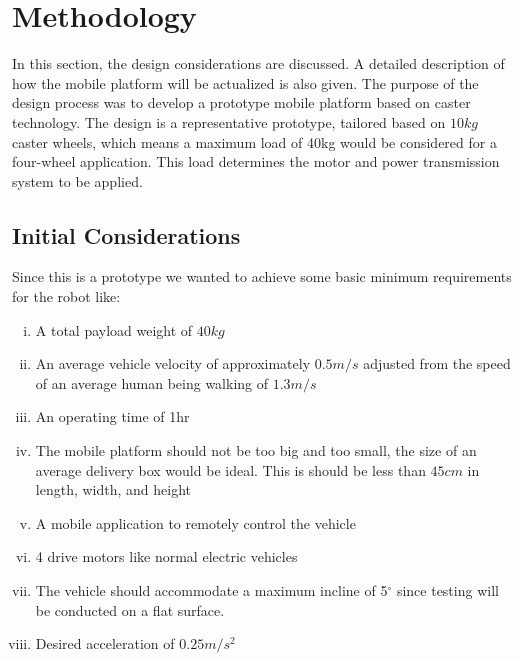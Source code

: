 \chapter{Methodology}
In this section, the design considerations are discussed. A detailed description of how the mobile platform will be actualized is also given. The purpose of the design process was to develop a prototype mobile platform based on caster technology. The design is a representative prototype, tailored based on $10kg$ caster wheels, which means a maximum load of 40kg would be considered for a four-wheel application. This load determines the motor and power transmission system to be applied. 


\section{Initial Considerations}
Since this is a prototype we wanted to achieve some basic minimum requirements for the robot like:
\begin{enumerate}[i.]
    \item A total payload weight of $40 kg$
    \item An average vehicle velocity of approximately $0.5m/s$ adjusted from the speed of an average human being walking of $1.3 m/s$ 
    \item An operating time of 1hr
    \item The mobile platform should not be too big and too small, the size of an average delivery box would be ideal. This is should be less than $45cm$ in length, width, and height 
    \item A mobile application to remotely control the vehicle
    \item 4 drive motors like normal electric vehicles
    \item The vehicle should accommodate a maximum incline of 5$^{\circ}$ since testing  will be conducted on a flat surface.
    \item Desired acceleration of $0.25 m/s^2$
\end{enumerate}

